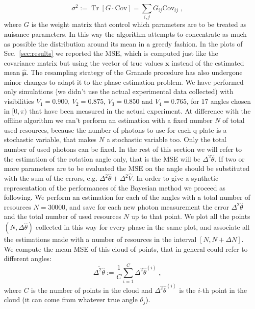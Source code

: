 \documentclass[aps, pra, 10pt, twocolumn, superscriptaddress,floatfix]{revtex4-1}
\DeclareMathOperator{\tr}{Tr}
\begin{document}
%
\begin{equation}
	\sigma^2 := \tr \left[ G \cdot \text{Cov} \right] = \sum_{i, j} G_{ij} \text{Cov}_{ij} \; ,
\end{equation}
%
where $G$ is the weight matrix that control which parameters are to be treated as nuisance parameters. In this way the algorithm attempts to concentrate as much as possible the distribution around its mean in a greedy fashion. In the plots of Sec.~\ref{sec:results} we reported the MSE, which is computed just like the covariance matrix but using the vector of true values $\boldsymbol{x}$ instead of the estimated mean $\boldsymbol{\hat{\mu}}$. The resampling strategy of the Granade procedure has also undergone minor changes to adapt it to the phase estimation problem. We have performed only simulations (we didn't use the actual experimental data collected) with visibilities $V_1 = 0.900$, $V_2 = 0.875$, $V_3 = 0.850$ and $V_4 = 0.765$, for $17$ angles chosen in $[0, \pi)$ that have been measured in the actual experiment. At difference with the offline algorithm we can't perform an estimation with a fixed number $N$ of total used resources, because the number of photons to use for each q-plate is a stochastic variable, that makes $N$ a stochastic variable too. Only the total number of used photons can be fixed.  In the rest of this section we will refer to the estimation of the rotation angle only, that is the MSE will be $\Delta^2 \hat{\theta}$. If two or more parameters are to be evaluated the MSE on the angle should be substituted with the sum of the errors, e.g. $\Delta^2 \hat{\theta} + \Delta^2 \hat{V}$. In order to give a synthetic representation of the performances of the Bayesian method we proceed as following. We perform an estimation for each of the angles with a total number of resources $N=30000$, and save for each new photon measurement the error $\Delta^2 \hat{\theta}$ and the total number of used resources $N$ up to that point. We plot all the points $(N, \Delta \hat{\theta})$ collected in this way for every phase in the same plot, and associate all the estimations made with a number of resources in the interval $[N, N + \Delta N]$. We compute the mean MSE of this cloud of points, that in general could refer to different angles:
%
\begin{equation}
	\overline{\Delta^2 \hat{\theta}} := \frac{1}{C} \sum_{i=1}^{C} \Delta^2 \hat{\theta}^{(i)} \; ,
\end{equation}
%
where $C$ is the number of points in the cloud and $\Delta^2 \hat{\theta}^{(i)}$ is the $i$-th point in the cloud (it can come from whatever true angle $\theta_j$). 
\end{document}
